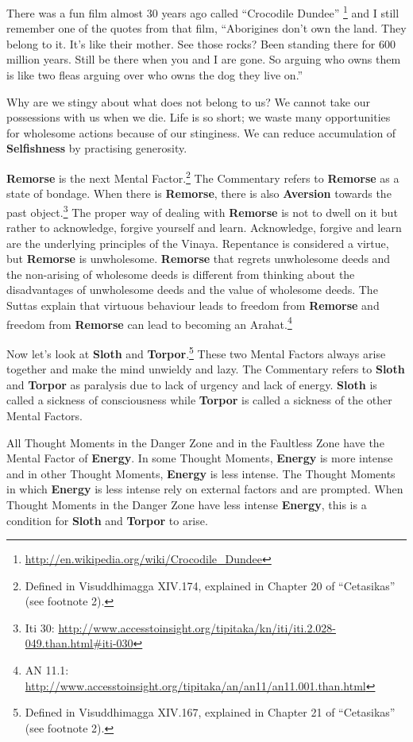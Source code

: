 There was a fun film almost 30 years ago called “Crocodile Dundee” \footnote{\url{http://en.wikipedia.org/wiki/Crocodile_Dundee}} and I still remember one of the quotes from that film, “Aborigines don’t own the land. They belong to it. It’s like their mother. See those rocks? Been standing there for 600 million years. Still be there when you and I are gone. So arguing who owns them is like two fleas arguing over who owns the dog they live on.”

Why are we stingy about what does not belong to us? We cannot take our possessions with us when we die. Life is so short; we waste many opportunities for wholesome actions because of our stinginess. We can reduce accumulation of \textbf{Selfishness} by practising generosity.

\textbf{Remorse} is the next Mental Factor.\footnote{Defined in Visuddhimagga XIV.174, explained in Chapter 20 of “Cetasikas” (see footnote 2).} The Commentary refers to \textbf{Remorse} as a state of bondage. When there is \textbf{Remorse}, there is also \textbf{Aversion} towards the past object.\footnote{Iti 30: \url{http://www.accesstoinsight.org/tipitaka/kn/iti/iti.2.028-049.than.html\#iti-030}} The proper way of dealing with \textbf{Remorse} is not to dwell on it but rather to acknowledge, forgive yourself and learn. Acknowledge, forgive and learn are the underlying principles of the Vinaya. Repentance is considered a virtue, but \textbf{Remorse} is unwholesome. \textbf{Remorse} that regrets unwholesome deeds and the non-arising of wholesome deeds is different from thinking about the disadvantages of unwholesome deeds and the value of wholesome deeds. The Suttas explain that virtuous behaviour leads to freedom from \textbf{Remorse} and freedom from \textbf{Remorse} can lead to becoming an Arahat.\footnote{AN 11.1: \url{http://www.accesstoinsight.org/tipitaka/an/an11/an11.001.than.html}}

Now let’s look at \textbf{Sloth} and \textbf{Torpor}.\footnote{Defined in Visuddhimagga XIV.167, explained in Chapter 21 of “Cetasikas” (see footnote 2).} These two Mental Factors always arise together and make the mind unwieldy and lazy. The Commentary refers to \textbf{Sloth} and \textbf{Torpor} as paralysis due to lack of urgency and lack of energy. \textbf{Sloth} is called a sickness of consciousness while \textbf{Torpor} is called a sickness of the other Mental Factors.

All Thought Moments in the Danger Zone and in the Faultless Zone have the Mental Factor of \textbf{Energy}. In some Thought Moments, \textbf{Energy} is more intense and in other Thought Moments, \textbf{Energy} is less intense. The Thought Moments in which \textbf{Energy} is less intense rely on external factors and are prompted. When Thought Moments in the Danger Zone have less intense \textbf{Energy}, this is a condition for \textbf{Sloth} and \textbf{Torpor} to arise.

